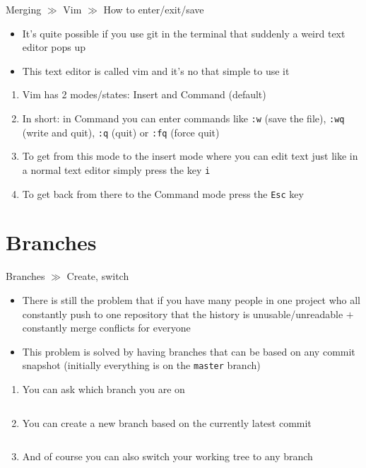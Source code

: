 \documentclass[10pt]{beamer}
\begin{document}
\begin{frame}{Merging $\gg$ Vim $\gg$ How to enter/exit/save}
\begin{itemize}
\item It's quite possible if you use git in the terminal that suddenly a weird text editor pops up
\item This text editor is called vim and it's no that simple to use it
\end{itemize}
\begin{enumerate}
	\item Vim has 2 modes/states: Insert and Command (default)
	\item In short: in Command you can enter commands like \texttt{:w} (save the file), \texttt{:wq} (write and quit), \texttt{:q} (quit) or \texttt{:fq} (force quit)
	\item To get from this mode to the insert mode where you can edit text just like in a normal text editor simply press the key \texttt{i}
	\item To get back from there to the Command mode press the \texttt{Esc} key
\end{enumerate}
\end{frame}

\section{Branches}

\begin{frame}{Branches $\gg$ Create, switch}
\begin{center}
\begin{itemize}
\item There is still the problem that if you have many people in one project who all constantly push to one repository that the history is unusable/unreadable $+$ constantly merge conflicts for everyone
\item This problem is solved by having branches that can be based on any commit snapshot (initially everything is on the \texttt{master} branch)
\end{itemize}
\begin{enumerate}
	\item You can ask which branch you are on \\
	\inputminted[bgcolor=lightGreyCustom,fontsize=\scriptsize]{sh}{./resources/git_branches_01_branch.sh}
	\item You can create a new branch based on the currently latest commit \\
	\inputminted[bgcolor=lightGreyCustom,fontsize=\scriptsize]{sh}{./resources/git_branches_02_create.sh}
	\item And of course you can also switch your working tree to any branch \\
	\inputminted[bgcolor=lightGreyCustom,fontsize=\scriptsize]{sh}{./resources/git_branches_03_checkout.sh}
\end{enumerate}
\end{center}
\end{frame}
\end{document}
